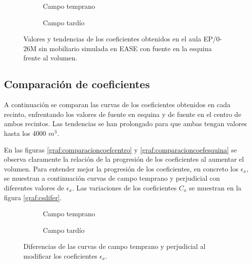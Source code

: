 
\begin{figure}[H]
    \begin{subfigure}[b]{0.4\textwidth}
    	\centering%
         {%
    }
    \caption{Campo temprano}%
    \end{subfigure}%
    \hspace{1.65cm}%
    \begin{subfigure}[b]{0.4\textwidth}%
    	\centering%
        {%
    }
    \caption{Campo tardío}%
    \end{subfigure}
    \caption{Valores y tendencias de los coeficientes obtenidos en el aula EP/0-26M sin mobiliario simulada en EASE con fuente en la esquina frente al volumen.}
\label{graf:coefepsearlylateesquina}%
\end{figure}


\subsection{Comparación de coeficientes}
\label{comparacioncoef}
A continuación se comparan las curvas de los coeficientes obtenidos en cada recinto, enfrentando los valores de fuente en esquina y de fuente en el centro de ambos recintos. Las tendencias se han prolongado para que ambas tengan valores hasta los 4000 $m^3$.


En las figuras \ref{graf:comparacioncoefcentro} y \ref{graf:comparacioncoefesquina} se observa claramente la relación de la progresión de los coeficientes al aumentar el volumen. Para entender mejor la progresión de los coeficientes, en concreto los $\epsilon_x$, se muestran a continuación curvas de campo temprano y perjudicial con diferentes valores de $\epsilon_x$. Las variaciones de los coeficientes $C_x$ se muestran en la figura \ref{graf:csdifer}.

\begin{figure}[ht]
    \begin{subfigure}[b]{0.4\textwidth}
    	\centering%
         {%
    }
    \caption{Campo temprano}%
    \end{subfigure}%
    \hspace{1.65cm}%
    \begin{subfigure}[b]{0.4\textwidth}%
    	\centering%
        {%
    }
    \caption{Campo tardío}%
    \end{subfigure}
    \caption{Diferencias de las curvas de campo temprano y perjudicial al modificar los coeficientes $\epsilon_x$.}
\label{graf:democoeficientes}%
\end{figure}
\FloatBarrier 


